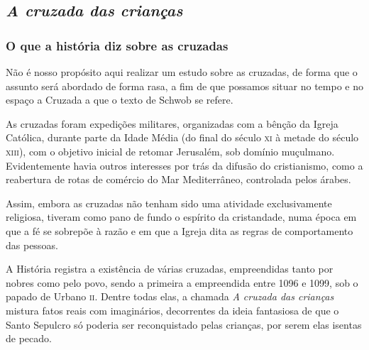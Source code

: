 \documentclass[12pt]{extarticle}
\begin{document}


\subsection{\emph{A cruzada das crianças}}


\subsubsection{O que a história diz sobre as cruzadas}

Não é nosso propósito aqui realizar um estudo sobre as cruzadas, de
forma que o assunto será abordado de forma rasa, a fim de que possamos
situar no tempo e no espaço a Cruzada a que o texto de Schwob se refere.

As cruzadas foram expedições militares, organizadas com a bênção da
Igreja Católica, durante parte da Idade Média (do final do século \textsc{xi} à
metade do século \textsc{xiii}), com o objetivo inicial de retomar Jerusalém, sob
domínio muçulmano. Evidentemente havia outros interesses por trás da
difusão do cristianismo, como a reabertura de rotas de comércio do Mar
Mediterrâneo, controlada pelos árabes.




Assim, embora as cruzadas não tenham sido uma atividade exclusivamente
religiosa, tiveram como pano de fundo o espírito da cristandade, numa
época em que a fé se sobrepõe à razão e em que a Igreja dita as regras
de comportamento das pessoas.

A História registra a existência de várias cruzadas, empreendidas tanto
por nobres como pelo povo, sendo a primeira a empreendida entre 1096 e
1099, sob o papado de Urbano \textsc{ii}. Dentre todas elas, a chamada \textit{A cruzada
das crianças} mistura fatos reais com imaginários, decorrentes da ideia
fantasiosa de que o Santo Sepulcro só poderia ser reconquistado pelas
crianças, por serem elas isentas de pecado.
\end{document}
